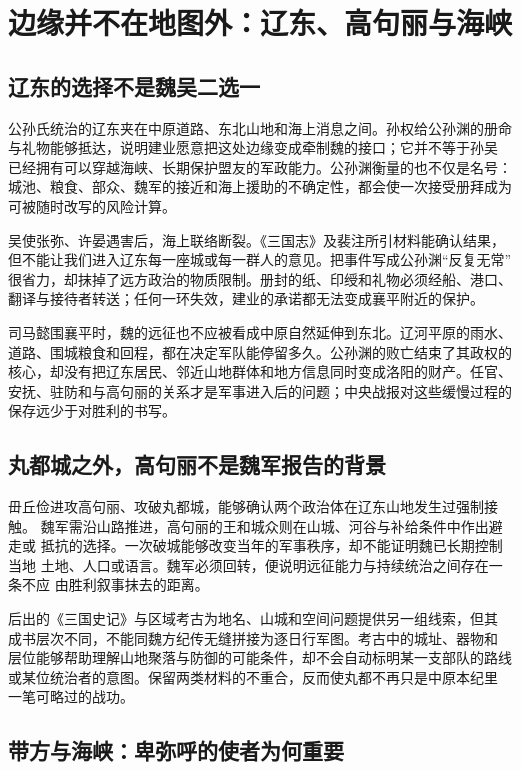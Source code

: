 \section{边缘并不在地图外：辽东、高句丽与海峡}

\subsection{辽东的选择不是魏吴二选一}

公孙氏统治的辽东夹在中原道路、东北山地和海上消息之间。孙权给公孙渊的册命
与礼物能够抵达，说明建业愿意把这处边缘变成牵制魏的接口；它并不等于孙吴
已经拥有可以穿越海峡、长期保护盟友的军政能力。公孙渊衡量的也不仅是名号：
城池、粮食、部众、魏军的接近和海上援助的不确定性，都会使一次接受册拜成为
可被随时改写的风险计算。

吴使张弥、许晏遇害后，海上联络断裂。《三国志》及裴注所引材料能确认结果，
但不能让我们进入辽东每一座城或每一群人的意见。把事件写成公孙渊“反复无常”
很省力，却抹掉了远方政治的物质限制。册封的纸、印绶和礼物必须经船、港口、
翻译与接待者转送；任何一环失效，建业的承诺都无法变成襄平附近的保护。

司马懿围襄平时，魏的远征也不应被看成中原自然延伸到东北。辽河平原的雨水、
道路、围城粮食和回程，都在决定军队能停留多久。公孙渊的败亡结束了其政权的
核心，却没有把辽东居民、邻近山地群体和地方信息同时变成洛阳的财产。任官、
安抚、驻防和与高句丽的关系才是军事进入后的问题；中央战报对这些缓慢过程的
保存远少于对胜利的书写。

\subsection{丸都城之外，高句丽不是魏军报告的背景}

毌丘俭进攻高句丽、攻破丸都城，能够确认两个政治体在辽东山地发生过强制接触。
魏军需沿山路推进，高句丽的王和城众则在山城、河谷与补给条件中作出避走或
抵抗的选择。一次破城能够改变当年的军事秩序，却不能证明魏已长期控制当地
土地、人口或语言。魏军必须回转，便说明远征能力与持续统治之间存在一条不应
由胜利叙事抹去的距离。

后出的《三国史记》与区域考古为地名、山城和空间问题提供另一组线索，但其
成书层次不同，不能同魏方纪传无缝拼接为逐日行军图。考古中的城址、器物和
层位能够帮助理解山地聚落与防御的可能条件，却不会自动标明某一支部队的路线
或某位统治者的意图。保留两类材料的不重合，反而使丸都不再只是中原本纪里
一笔可略过的战功。

\subsection{带方与海峡：卑弥呼的使者为何重要}

